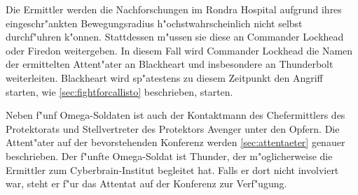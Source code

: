 Die Ermittler werden die Nachforschungen im Rondra Hospital aufgrund ihres eingeschr"ankten Bewegungsradius h"ochstwahrscheinlich nicht selbst durchf"uhren k"onnen. Stattdessen m"ussen sie diese an Commander Lockhead oder Firedon weitergeben. In diesem Fall wird Commander Lockhead die Namen der ermittelten Attent"ater an Blackheart und insbesondere an Thunderbolt weiterleiten. Blackheart wird sp"atestens zu diesem Zeitpunkt den Angriff starten, wie \cref{sec:fightforcallisto} beschrieben, starten.

Neben f"unf Omega-Soldaten ist auch der Kontaktmann des Chefermittlers des Protektorats und Stellvertreter des Protektors Avenger unter den Opfern. Die Attent"ater auf der bevorstehenden Konferenz werden \cref{sec:attentaeter} genauer beschrieben. Der f"unfte Omega-Soldat ist Thunder, der m"oglicherweise die Ermittler zum Cyberbrain-Institut begleitet hat. Falls er dort nicht involviert war, steht er f"ur das Attentat auf der Konferenz zur Verf"ugung.

